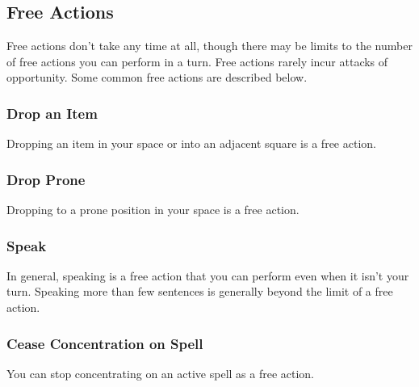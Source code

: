 \subsection{Free Actions}

Free actions don't take any time at all, though there may be limits to the number of free actions you can perform in a turn. Free actions rarely incur attacks of opportunity. Some common free actions are described below.

\subsubsection{Drop an Item}
Dropping an item in your space or into an adjacent square is a free action.

\subsubsection{Drop Prone}
Dropping to a prone position in your space is a free action.

\subsubsection{Speak}
In general, speaking is a free action that you can perform even when it isn't your turn. Speaking more than few sentences is generally beyond the limit of a free action.

\subsubsection{Cease Concentration on Spell}
You can stop concentrating on an active spell as a free action.
